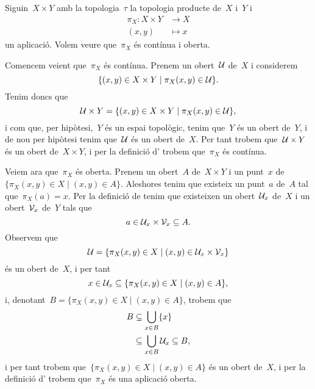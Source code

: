 \documentclass[../../main.tex]{subfiles}
\begin{document}
    \begin{example}[Projeccions]
        \label{ex:les projeccions en la topologia producte són contínues i obertes}
        Siguin~\(X\times Y\) amb la topologia~\(\tau\) la topologia producte de~\(X\) i~\(Y\) i
        \begin{align*}
            \pi_{X}\colon X\times Y&\longrightarrow X \\
            (x,y)&\longmapsto x
        \end{align*}
        un aplicació.
        Volem veure que~\(\pi_{X}\) és contínua i oberta.
        \begin{solution}
            Comencem veient que~\(\pi_{X}\) és contínua.
            Prenem un obert~\(\mathcal{U}\) de~\(X\) i considerem
            \[
                \{(x,y)\in X\times Y\mid \pi_{X}(x,y)\in\mathcal{U}\}.
            \]
            Tenim doncs que
            \[
                \mathcal{U}\times Y=\{(x,y)\in X\times Y\mid \pi_{X}(x,y)\in\mathcal{U}\},
            \]
            i com que, per hipòtesi,~\(Y\) és un espai topològic, tenim que~\(Y\) és un obert de~\(Y\), i de nou per hipòtesi tenim que~\(\mathcal{U}\) és un obert de~\(X\).
            Per tant trobem que~\(\mathcal{U}\times Y\) és un obert de~\(X\times Y\), i per la definició d' trobem que~\(\pi_{X}\) és contínua.

            Veiem ara que~\(\pi_{X}\) és oberta.
            Prenem un obert~\(A\) de~\(X\times Y\) i un punt~\(x\) de~\(\{\pi_{X}(x,y)\in X\mid(x,y)\in A\}\).
            Aleshores tenim que existeix un punt~\(a\) de~\(A\) tal que~\(\pi_{X}(a)=x\).
            Per la definició de  tenim que existeixen un obert~\(\mathcal{U}_{x}\) de~\(X\) i un obert~\(\mathcal{V}_{x}\) de~\(Y\) tals que
            \[
                a\in\mathcal{U}_{x}\times\mathcal{V}_{x}\subseteq A.
            \]
            Observem que
            \[
                \mathcal{U}=\{\pi_{X}(x,y)\in X\mid(x,y)\in\mathcal{U}_{x}\times\mathcal{V}_{x}\}
            \]
            és un obert de~\(X\), i per tant
            \[
                x\in\mathcal{U}_{x}\subseteq\{\pi_{X}(x,y)\in X\mid(x,y)\in A\},
            \]
            i, denotant~\(B=\{\pi_{X}(x,y)\in X\mid(x,y)\in A\}\), trobem que
            \begin{align*}
                B&\subseteq\bigcup_{x\in B}\{x\} \\
                &\subseteq\bigcup_{x\in B}\mathcal{U}_{x}\subseteq B,
            \end{align*}
            i per tant trobem que~\(\{\pi_{X}(x,y)\in X\mid(x,y)\in A\}\) és un obert de~\(X\), i per la definició d' trobem que~\(\pi_{X}\) és una aplicació oberta.
        \end{solution}
    \end{example}
\end{document}
